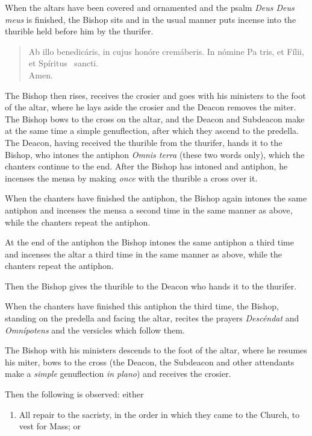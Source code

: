 \documentclass[letterpaper]{report}
\newcommand\blessincense{
\begin{quote}
   Ab illo benedicáris, in cujus honóre cremáberis. In nómine Pa\cross
    tris, et Fí\cross lii, et Spíritus \cross\ sancti. \\ \rbar Amen.
\end{quote}
}
\begin{document}
{    \rubric When the altars have been covered and ornamented and the psalm
    \textit{Deus Deus meus} is finished, the Bishop sits and in the usual manner
    puts incense into the thurible held before him by the thurifer.

    \blessincense

    The Bishop then rises, receives the crosier and goes with his ministers to the
    foot of the altar, where he lays aside the crosier and the Deacon removes the
    miter. The Bishop bows to the cross on the altar, and the Deacon and Subdeacon
    make at the same time a simple genuflection, after which they ascend to the
    predella. The Deacon, having received the thurible from the thurifer, hands it
    to the Bishop, who intones the antiphon \textit{Omnis terra} (these two words
    only), which the chanters continue to the end. After the Bishop has intoned and
    antiphon, he incenses the mensa by making \textit{once} with the thurible a
    cross over it.

    \rubric When the chanters have finished the antiphon, the Bishop again intones
    the same antiphon and incenses the mensa a second time in the same manner as
    above, while the chanters repeat the antiphon.

    \rubric At the end of the antiphon the Bishop intones the same antiphon a third
    time and incenses the altar a third time in the same manner as above, while the
    chanters repeat the antiphon.

    Then the Bishop gives the thurible to the Deacon who hands it to the thurifer.

    \rubric When the chanters have finished this antiphon the third time, the
    Bishop, standing on the predella and facing the altar, recites the prayers
    \textit{Descéndat} and \textit{Omnípotens} and the versicles which follow them.

    \rubric The Bishop with his ministers descends to the foot of the altar, where
    he resumes his miter, bows to the cross (the Deacon, the Subdeacon and other
    attendants make a \textit{simple} genuflection \textit{in plano}) and receives
    the crosier.

    Then the following is observed: either

    \begin{enumerate}

        \item All repair to the sacristy, in the order in which they came to the
            Church, to vest for Mass; or


\end{enumerate}}
\end{document}
